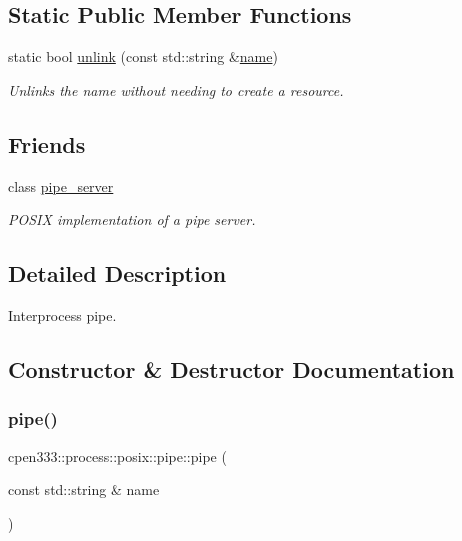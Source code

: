 \subsection*{Static Public Member Functions}
\begin{DoxyCompactItemize}
\item 
static bool \hyperlink{classcpen333_1_1process_1_1posix_1_1pipe_aef89e04134417c569972bd565741622b}{unlink} (const std\+::string \&\hyperlink{classcpen333_1_1process_1_1impl_1_1named__resource__base_a53986a0a1dd26a3602b842c45613b79d}{name})
\begin{DoxyCompactList}\small\item\em Unlinks the name without needing to create a resource. \end{DoxyCompactList}\end{DoxyCompactItemize}
\subsection*{Friends}
\begin{DoxyCompactItemize}
\item 
class \hyperlink{classcpen333_1_1process_1_1posix_1_1pipe_ab111e84ef31179e72c2bd2e58e2042b0}{pipe\+\_\+server}
\begin{DoxyCompactList}\small\item\em P\+O\+S\+IX implementation of a pipe server. \end{DoxyCompactList}\end{DoxyCompactItemize}


\subsection{Detailed Description}
Interprocess pipe. 

\subsection{Constructor \& Destructor Documentation}
\mbox{\label{classcpen333_1_1process_1_1posix_1_1pipe_ac39ea29cbd5084681acde6b02b27bf91}} 
\subsubsection{\texorpdfstring{pipe()}{pipe()}\hspace{0.1cm}{\footnotesize\ttfamily [1/2]}}
{\footnotesize\ttfamily cpen333\+::process\+::posix\+::pipe\+::pipe (\begin{DoxyParamCaption}\item[{const std\+::string \&}]{name }\end{DoxyParamCaption})\hspace{0.3cm}{\ttfamily [inline]}}




